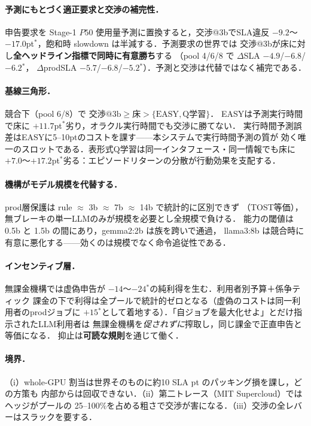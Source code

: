 \documentclass[uplatex,twocolumn,fontsize=9pt,paper=a4]{jlreq}
\newcommand{\sig}{$^{*}$}
\begin{document}
\paragraph{予測にもとづく適正要求と交渉の補完性．}
申告要求を Stage-1 $P50$ 使用量予測に置換すると，交渉@3bでSLA違反
$-9.2$〜$-17.0$pt\sig，飽和時 slowdown は半減する．予測要求の世界では
交渉@3bが床に対し\textbf{全ヘッドライン指標で同時に有意勝ち}する
（pool 4/6/8 で $\Delta$SLA $-4.9$/$-6.8$/$-6.2$\sig，
$\Delta$prodSLA $-5.7$/$-6.8$/$-5.2$\sig）．予測と交渉は代替ではなく補完である．

\paragraph{基線三角形．}
競合下（pool 6/8）で $\text{交渉@3b} \ge \text{床} > \{\text{EASY}, \text{Q学習}\}$．
EASYは予測実行時間で床に $+11.7$pt\sig 劣り，オラクル実行時間でも交渉に勝てない．
実行時間予測誤差はEASYに5--10ptのコストを課す——本システムで実行時間予測の質が
効く唯一のスロットである．表形式Q学習は同一インタフェース・同一情報でも床に
$+7.0$〜$+17.2$pt\sig 劣る：エピソードリターンの分散が行動効果を支配する．

\paragraph{機構がモデル規模を代替する．}
prod層保護は rule $\approx$ 3b $\approx$ 7b $\approx$ 14b で統計的に区別できず
（TOST等価），無ブレーキの単一LLMのみが規模を必要とし全規模で負ける．
能力の閾値は 0.5b と 1.5b の間にあり，gemma2:2b は族を跨いで通過，
llama3:8b は競合時に有意に悪化する——効くのは規模でなく命令追従性である．

\paragraph{インセンティブ層．}
無課金機構では虚偽申告が $-14$〜$-24$\sig の純利得を生む．利用者別予算＋係争ティック
課金の下で利得は全プールで統計的ゼロとなる（虚偽のコストは同一利用者のprodジョブに
$+15$\sig として着地する）．「自ジョブを最大化せよ」とだけ指示されたLLM利用者は
無課金機構を\textit{促されずに}搾取し，同じ課金で正直申告と等価になる．
抑止は\textbf{可読な規則}を通じて働く．

\paragraph{境界．}
（i）whole-GPU 割当は世界そのものに約10 SLA pt のパッキング損を課し，どの方策も
内部からは回収できない．（ii）第二トレース（MIT Supercloud）ではヘッジがプールの
25--100\%を占める粗さで交渉が害になる．（iii）交渉の全レバーはスラックを要する．
\end{document}
